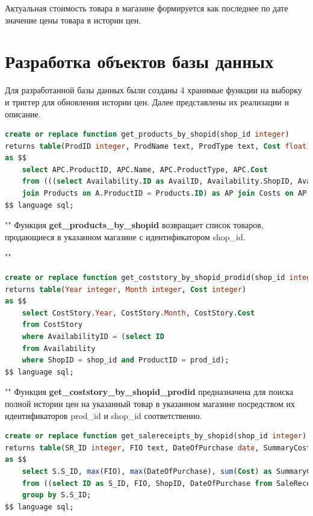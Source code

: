 \documentclass[a4paper,14pt]{extreport}
\begin{document}
Актуальная стоимость товара в магазине формируется как последнее по дате значение цены товара в истории цен.

\section{Разработка объектов базы данных}

Для разработанной базы данных были созданы 4 хранимые функции на выборку и триггер для обновления истории цен. Далее представлены их реализации и описание.

\captionsetup{singlelinecheck = false, justification=raggedright}
\begin{lstlisting}[language=sql, caption={Реализация хранимой функции get\_products\_by\_shopid}]
create or replace function get_products_by_shopid(shop_id integer)
returns table(ProdID integer, ProdName text, ProdType text, Cost float)
as $$
	select APC.ProductID, APC.Name, APC.ProductType, APC.Cost
	from (((select Availability.ID as AvailID, Availability.ShopID, Availability.ProductID from Availability where Availability.ShopID = shop_id) as A 
	join Products on A.ProductID = Products.ID) as AP join Costs on AP.AvailID = Costs.AvailabilityID) as APC;
$$ language sql;
\end{lstlisting}

""\newline\indent
Функция \textbf{get\_products\_by\_shopid} возвращает список товаров, продающиеся в указанном магазине с идентификатором shop\_id. 

""\newline
\begin{lstlisting}[language=sql, caption={Реализация хранимой функции get\_coststory\_by\_shopid\_prodid}]
create or replace function get_coststory_by_shopid_prodid(shop_id integer, prod_id integer)
returns table(Year integer, Month integer, Cost integer)
as $$
	select CostStory.Year, CostStory.Month, CostStory.Cost
	from CostStory
	where AvailabilityID = (select ID
	from Availability
	where ShopID = shop_id and ProductID = prod_id);
$$ language sql;
\end{lstlisting}

""\newline\indent
Функция \textbf{get\_coststory\_by\_shopid\_prodid} предназначена для поиска полной истории цен на указанный товар в указанном магазине посредством их идентификаторов prod\_id и shop\_id соответственно.

\begin{lstlisting}[language=sql, caption={Реализация хранимой функции get\_salereceipts\_by\_shopid}]
create or replace function get_salereceipts_by_shopid(shop_id integer)
returns table(SR_ID integer, FIO text, DateOfPurchase date, SummaryCost integer)
as $$
	select S.S_ID, max(FIO), max(DateOfPurchase), sum(Cost) as SummaryCost
	from ((select ID as S_ID, FIO, ShopID, DateOfPurchase from SaleReceipts where ShopID = shop_id) as SR join SaleReceiptPositions on SaleReceiptPositions.SaleReceiptID = SR.S_ID) as S join Costs on S.AvailabilityID = Costs.AvailabilityID
	group by S.S_ID;
$$ language sql;
\end{lstlisting}
\end{document}
